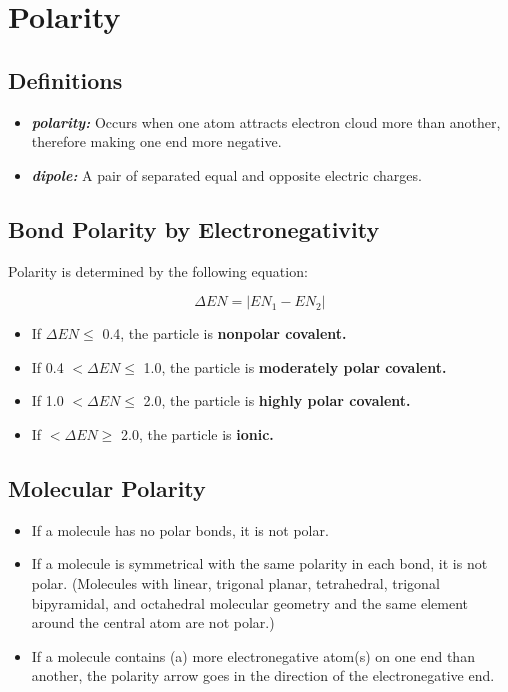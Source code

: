 \documentclass[a4paper, 12pt]{article}
\begin{document}
\section{Polarity}

\subsection*{Definitions}

\begin{itemize}[leftmargin=*, nosep]
    \item \textbf{\textit{polarity:}} Occurs when one atom attracts electron cloud more than another, therefore making one end more negative.
    \item \textbf{\textit{dipole:}} A pair of separated equal and opposite electric charges.
\end{itemize}

\subsection*{Bond Polarity by Electronegativity}
Polarity is determined by the following equation:

$$\Delta EN = |EN_1 - EN_2| $$

\begin{itemize}[leftmargin=*, nosep]
\item \noindent If $\Delta EN \leq$ 0.4, the particle is \textbf{nonpolar covalent.}
\item If 0.4 $< \Delta EN \leq$ 1.0, the particle is \textbf{moderately polar covalent.}
\item If 1.0 $< \Delta EN \leq$ 2.0, the particle is \textbf{highly polar covalent.}
\item If $< \Delta EN \geq$ 2.0, the particle is \textbf{ionic.}
\end{itemize}

\subsection*{Molecular Polarity}

\begin{itemize}[leftmargin=*, nosep]
    \item If a molecule has no polar bonds, it is not polar.
    \item If a molecule is symmetrical with the same polarity in each bond, it is not polar. (Molecules with linear, trigonal planar, tetrahedral, trigonal bipyramidal, and octahedral molecular geometry and the same element around the central atom are not polar.)
    \item If a molecule contains (a) more electronegative atom(s) on one end than another, the polarity arrow goes in the direction of the electronegative end.
\end{itemize}
\end{document}

